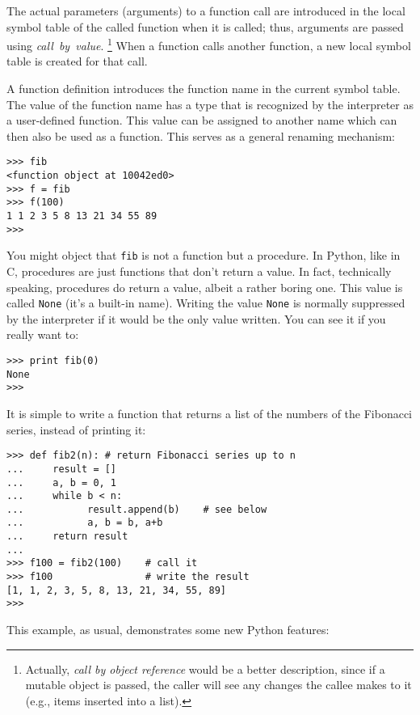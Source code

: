 The actual parameters (arguments) to a function call are introduced in
the local symbol table of the called function when it is called; thus,
arguments are passed using {\em call\ by\ value}.%
\footnote{
         Actually, {\em call  by  object reference} would be a better
         description, since if a mutable object is passed, the caller
         will see any changes the callee makes to it (e.g., items
         inserted into a list).
}
When a function calls another function, a new local symbol table is
created for that call.

A function definition introduces the function name in the
current
symbol table.  The value
of the function name
has a type that is recognized by the interpreter as a user-defined
function.  This value can be assigned to another name which can then
also be used as a function.  This serves as a general renaming
mechanism:

\bcode\begin{verbatim}
>>> fib
<function object at 10042ed0>
>>> f = fib
>>> f(100)
1 1 2 3 5 8 13 21 34 55 89
>>> 
\end{verbatim}\ecode
%
You might object that {\tt fib} is not a function but a procedure.  In
Python, like in C, procedures are just functions that don't return a
value.  In fact, technically speaking, procedures do return a value,
albeit a rather boring one.  This value is called {\tt None} (it's a
built-in name).  Writing the value {\tt None} is normally suppressed by
the interpreter if it would be the only value written.  You can see it
if you really want to:

\bcode\begin{verbatim}
>>> print fib(0)
None
>>> 
\end{verbatim}\ecode
%
It is simple to write a function that returns a list of the numbers of
the Fibonacci series, instead of printing it:

\bcode\begin{verbatim}
>>> def fib2(n): # return Fibonacci series up to n
...     result = []
...     a, b = 0, 1
...     while b < n:
...           result.append(b)    # see below
...           a, b = b, a+b
...     return result
... 
>>> f100 = fib2(100)    # call it
>>> f100                # write the result
[1, 1, 2, 3, 5, 8, 13, 21, 34, 55, 89]
>>> 
\end{verbatim}\ecode
%
This example, as usual, demonstrates some new Python features:

